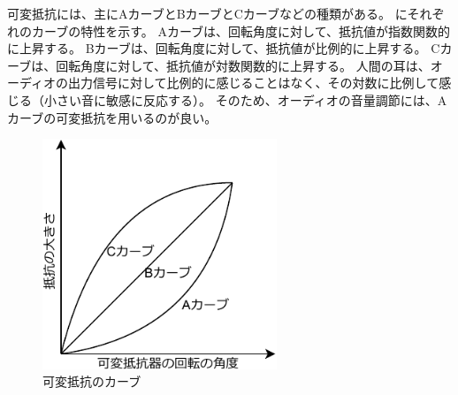 \documentclass[report.tex]{subfiles}
\begin{document}
可変抵抗には、主にAカーブとBカーブとCカーブなどの種類がある。
にそれぞれのカーブの特性を示す。
Aカーブは、回転角度に対して、抵抗値が指数関数的に上昇する。
Bカーブは、回転角度に対して、抵抗値が比例的に上昇する。
Cカーブは、回転角度に対して、抵抗値が対数関数的に上昇する。
人間の耳は、オーディオの出力信号に対して比例的に感じることはなく、その対数に比例して感じる（小さい音に敏感に反応する）。
そのため、オーディオの音量調節には、Aカーブの可変抵抗を用いるのが良い。

\begin{figure}[H]
	\centering
	\includegraphics[width=7cm]{fig/cabe.pdf}
	\caption{可変抵抗のカーブ}
	\label{fig:cabe}
\end{figure}
\end{document}
